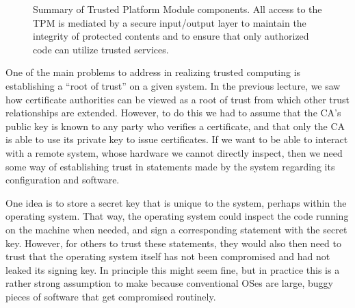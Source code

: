 \documentclass[11pt]{article}
\begin{document}
\begin{figure}

\caption{\label{fig:tpm} Summary of Trusted Platform Module components. All access to the TPM is mediated by a secure input/output layer to maintain the integrity of protected contents and to ensure that only authorized code can utilize trusted services.}
\end{figure}

One of the main problems to address in realizing trusted computing is establishing a ``root of trust'' on a given system. In the previous lecture, we saw how certificate authorities can be viewed as a root of trust from which other trust relationships are extended. However, to do this we had to assume that the CA's public key is known to any party who verifies a certificate, and that only the CA is able to use its private key to issue certificates. If we want to be able to interact with a remote system, whose hardware we cannot directly inspect, then we need some way of establishing trust in statements made by the system regarding its configuration and software.

One idea is to store a secret key that is unique to the system, perhaps within the operating system. That way, the operating system could inspect the code running on the machine when needed, and sign a corresponding statement with the secret key. However, for others to trust these statements, they would also then need to trust that the operating system itself has not been compromised and had not leaked its signing key. In principle this might seem fine, but in practice this is a rather strong assumption to make because conventional OSes are large, buggy pieces of software that get compromised routinely.
\end{document}
